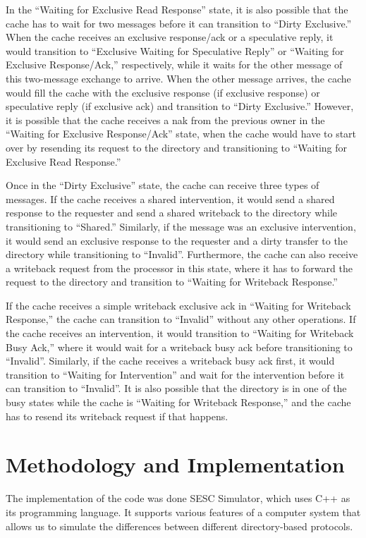 \documentclass[letterpaper]{article}
\begin{document}
In the ``Waiting for Exclusive Read Response'' state, it is also possible that the cache has to wait for two messages before it can transition to ``Dirty Exclusive.'' When the cache receives an exclusive response/ack or a speculative reply, it would transition to ``Exclusive Waiting for Speculative Reply'' or ``Waiting for Exclusive Response/Ack,'' respectively, while it waits for the other message of this two-message exchange to arrive. When the other message arrives, the cache would fill the cache with the exclusive response (if exclusive response) or speculative reply (if exclusive ack) and transition to ``Dirty Exclusive.'' However, it is possible that the cache receives a nak from the previous owner in the ``Waiting for Exclusive Response/Ack'' state, when the cache would have to start over by resending its request to the directory and transitioning to ``Waiting for Exclusive Read Response.''

Once in the ``Dirty Exclusive'' state, the cache can receive three types of messages. If the cache receives a shared intervention, it would send a shared response to the requester and send a shared writeback to the directory while transitioning to ``Shared.'' Similarly, if the message was an exclusive intervention, it would send an exclusive response to the requester and a dirty transfer to the directory while transitioning to ``Invalid''. Furthermore, the cache can also receive a writeback request from the processor in this state, where it has to forward the request to the directory and transition to ``Waiting for Writeback Response.''

If the cache receives a simple writeback exclusive ack in ``Waiting for Writeback Response,'' the cache can transition to ``Invalid'' without any other operations. If the cache receives an intervention, it would transition to ``Waiting for Writeback Busy Ack,'' where it would wait for a writeback busy ack before transitioning to ``Invalid''. Similarly, if the cache receives a writeback busy ack first, it would transition to ``Waiting for Intervention'' and wait for the intervention before it can transition to ``Invalid''. It is also possible that the directory is in one of the busy states while the cache is ``Waiting for Writeback Response,'' and the cache has to resend its writeback request if that happens.

\section[Methodology and Implementation]{\rmfamily Methodology and Implementation}
The implementation of the code was done SESC Simulator, which uses C++ as its programming language. It supports various features of a computer system that allows us to simulate the differences between different directory-based protocols.
\end{document}
